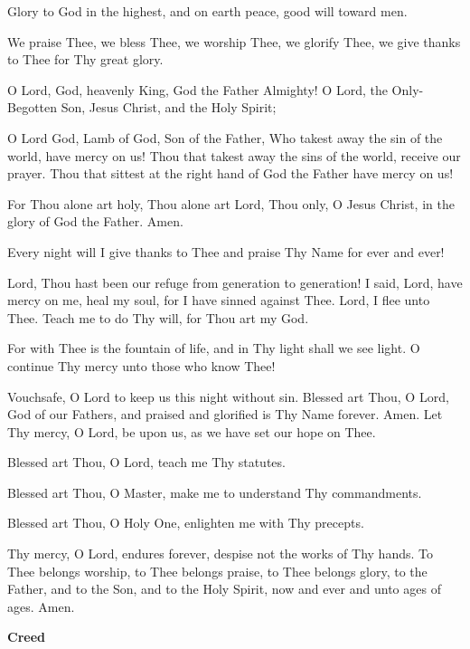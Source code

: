 \begin{hang}
\noindent{}Glory to God in the highest, and on earth 
peace, good will toward men.

We praise Thee, we bless Thee, we worship Thee, we glorify Thee, we give thanks 
to Thee for Thy great glory.

O Lord, God, heavenly King, God the Father Almighty! O Lord, the Only-Begotten 
Son, Jesus Christ, and the Holy Spirit;

O Lord God, Lamb of God, Son of the Father, Who takest away the sin of the 
world, have mercy on us!  Thou that takest away the sins of the world, receive 
our prayer.  Thou that sittest at the right hand of God the Father have mercy 
on us!

For Thou alone art holy, Thou alone art Lord, Thou only, O Jesus Christ, in the 
glory of God the Father.  Amen.

Every night will I give thanks to Thee and praise Thy Name for ever and ever!

Lord, Thou hast been our refuge from generation to generation!  I said, Lord, 
have mercy on me, heal my soul, for I have sinned against Thee.  Lord, I flee 
unto Thee.  Teach me to do Thy will, for Thou art my God.

For with Thee is the fountain of life, and in Thy light shall we see light.  O continue Thy mercy unto those who know Thee!

Vouchsafe, O Lord to keep us this night without sin.  Blessed art Thou, O Lord, 
God of our Fathers, and praised and glorified is Thy Name forever.  Amen.  Let 
Thy mercy, O Lord, be upon us, as we have set our hope on Thee.

Blessed art Thou, O Lord, teach me Thy statutes.

Blessed art Thou, O Master, make me to understand Thy commandments.

Blessed art Thou, O Holy One, enlighten me with Thy precepts.

Thy mercy, O Lord, endures forever, despise not the works of Thy hands. To Thee 
belongs worship, to Thee belongs praise, to Thee belongs glory, to the Father, 
and to the Son, and to the Holy Spirit, now and ever and unto ages of ages. 
Amen.

\end{hang}


\begin{center}
\textbf{Creed}
\end{center}


